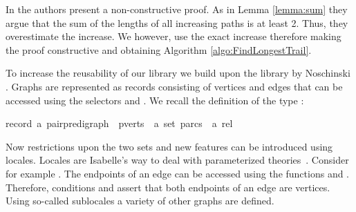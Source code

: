 \begin{isabellebody}
\begin{isamarkuptext}
In \cite{graham1973increasing} the authors present a non-constructive proof. As in Lemma \ref{lemma:sum} they argue that the 
sum of the lengths of all increasing paths is at least 2. Thus, they overestimate the increase. We however, use the exact increase therefore 
making the proof constructive and obtaining Algorithm \ref{algo:FindLongestTrail}.%
\end{isamarkuptext}\isamarkuptrue%
%
\isadelimdocument
%
\endisadelimdocument
%
\isatagdocument
%
\isamarkuptrue%
%
\endisatagdocument
{\isafolddocument}%
%
\isadelimdocument
%
\endisadelimdocument
%
\begin{isamarkuptext}%
\label{section:Formalization}%
\end{isamarkuptext}\isamarkuptrue%
%
\isadelimdocument
%
\endisadelimdocument
%
\isatagdocument
%
\isamarkuptrue%
%
\endisatagdocument
{\isafolddocument}%
%
\isadelimdocument
%
\endisadelimdocument
%
\begin{isamarkuptext}%
\label{section:GraphTheory} To increase the reusability of our library we build upon the 
library by Noschinski \cite{Graph_Theory-AFP}. Graphs are represented as records consisting of vertices and edges that
can be accessed using the selectors  and . We recall the definition 
of the type :

\begin{isabelle}%
record\ {\isacharprime}a\ pair{\isacharunderscore}pre{\isacharunderscore}digraph\ {\isacharequal}\ pverts\ {\isacharcolon}{\isacharcolon}\ {\isachardoublequote}{\isacharprime}a\ set{\isachardoublequote}\ parcs\ {\isacharcolon}{\isacharcolon}\ {\isachardoublequote}{\isacharprime}a\ rel{\isachardoublequote}%
\end{isabelle}

Now restrictions upon the two sets and new features can be introduced using locales. 
Locales are Isabelle's way to deal with parameterized theories~\cite{ballarin2010tutorial}. Consider
for example .
The endpoints of an edge can be accessed using the functions  and . Therefore, conditions
 and  assert that both endpoints of an edge are
vertices. Using so-called sublocales a variety of other graphs are defined.  


\end{isamarkuptext}
\end{isabellebody}
